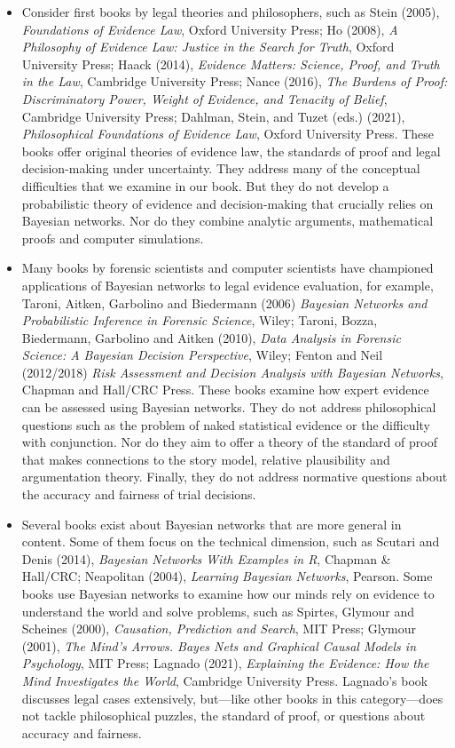 \documentclass[
  10pt,
  dvipsnames,enabledeprecatedfontcommands]{scrartcl}
\begin{document}
\begin{itemize}

\item Consider first books by legal theories and philosophers, such as 
Stein (2005), \textit{Foundations of Evidence Law}, Oxford University Press; Ho (2008), \textit{A Philosophy of Evidence Law: Justice in the Search for Truth}, Oxford University Press; Haack (2014), \textit{Evidence Matters: Science, Proof, and Truth in the Law}, Cambridge University Press; Nance (2016), \textit{The Burdens of Proof: Discriminatory Power, Weight of Evidence, and Tenacity of Belief}, Cambridge University Press;    Dahlman, Stein, and Tuzet (eds.) (2021), \textit{Philosophical Foundations of Evidence Law}, Oxford University Press.
These books offer original theories of evidence law, the standards of proof and legal decision-making  under uncertainty.   They address many of the conceptual difficulties that we examine in our book. But they do not develop a probabilistic theory of evidence and decision-making that crucially relies on Bayesian networks.  Nor do they combine analytic arguments, mathematical proofs and computer simulations. 

\item  Many books by forensic scientists and computer scientists  have championed applications of Bayesian networks to legal evidence evaluation, for example, Taroni, Aitken, Garbolino and Biedermann (2006) \textit{Bayesian Networks and Probabilistic Inference in Forensic Science}, Wiley;   Taroni,  Bozza,  Biedermann, Garbolino and  Aitken (2010), \textit{Data Analysis in Forensic Science: A Bayesian Decision Perspective}, Wiley; Fenton and Neil (2012/2018) \textit{Risk Assessment and Decision Analysis with Bayesian Networks}, Chapman and Hall/CRC Press. These books examine how expert evidence can be assessed using Bayesian networks. They do not address philosophical questions such as the problem of naked statistical evidence or the difficulty with conjunction. Nor do they aim to offer a theory of the standard of proof that makes connections to the story model, relative plausibility and argumentation theory. Finally, they do not address normative questions about the accuracy and fairness of trial decisions. 

\item Several books exist about Bayesian networks that are more general in content. Some of them focus on the technical dimension,  such as Scutari and  Denis (2014), \textit{Bayesian Networks With Examples in R}, Chapman \& Hall/CRC;  
Neapolitan (2004), \emph{Learning Bayesian Networks}, Pearson. Some books use Bayesian networks to examine how our minds rely on evidence to understand the world and solve problems, such as Spirtes, Glymour and Scheines (2000), \emph{Causation, Prediction and Search}, MIT Press; Glymour (2001),  \emph{The Mind's Arrows. Bayes Nets and Graphical Causal Models in Psychology}, MIT Press; Lagnado (2021), \textit{Explaining the Evidence: How the Mind Investigates the World}, Cambridge University Press. Lagnado's book discusses legal cases extensively, but---like other books in this category---does not tackle philosophical puzzles, the standard of proof, or questions about accuracy and fairness.


\end{itemize}
\end{document}
